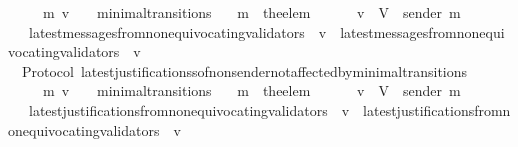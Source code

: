 \begin{isabellebody}
\ \ {\isachardoublequoteopen}{\isasymforall}\ {\isasymsigma}\ {\isasymsigma}{\isacharprime}\ m{\isacharprime}\ v{\isachardot}\ {\isacharparenleft}{\isasymsigma}{\isacharcomma}\ {\isasymsigma}{\isacharprime}{\isacharparenright}\ {\isasymin}\ minimal{\isacharunderscore}transitions\isanewline
\ \ {\isasymlongrightarrow}\ m{\isacharprime}\ {\isacharequal}\ the{\isacharunderscore}elem\ {\isacharparenleft}{\isasymsigma}{\isacharprime}\ {\isacharminus}\ {\isasymsigma}{\isacharparenright}\isanewline
\ \ {\isasymlongrightarrow}\ v\ {\isasymin}\ V\ {\isacharminus}\ {\isacharbraceleft}sender\ m{\isacharprime}{\isacharbraceright}\isanewline
\ \ {\isasymlongrightarrow}\ latest{\isacharunderscore}messages{\isacharunderscore}from{\isacharunderscore}non{\isacharunderscore}equivocating{\isacharunderscore}validators\ {\isasymsigma}\ v\ {\isacharequal}\ latest{\isacharunderscore}messages{\isacharunderscore}from{\isacharunderscore}non{\isacharunderscore}equivocating{\isacharunderscore}validators\ {\isasymsigma}{\isacharprime}\ v{\isachardoublequoteclose}\isanewline
%
\isadelimproof
\ \ %
\endisadelimproof
%
\isatagproof
{}\isamarkupfalse%
%
\endisatagproof
{\isafoldproof}%
%
\isadelimproof
\isanewline
%
\endisadelimproof
\isanewline
\isanewline
{}\isamarkupfalse%
\ {\isacharparenleft}\ Protocol{\isacharparenright}\ latest{\isacharunderscore}justificationss{\isacharunderscore}of{\isacharunderscore}non{\isacharunderscore}sender{\isacharunderscore}not{\isacharunderscore}affected{\isacharunderscore}by{\isacharunderscore}minimal{\isacharunderscore}transitions\ {\isacharcolon}\isanewline
\ \ {\isachardoublequoteopen}{\isasymforall}\ {\isasymsigma}\ {\isasymsigma}{\isacharprime}\ m{\isacharprime}\ v{\isachardot}\ {\isacharparenleft}{\isasymsigma}{\isacharcomma}\ {\isasymsigma}{\isacharprime}{\isacharparenright}\ {\isasymin}\ minimal{\isacharunderscore}transitions\isanewline
\ \ {\isasymlongrightarrow}\ m{\isacharprime}\ {\isacharequal}\ the{\isacharunderscore}elem\ {\isacharparenleft}{\isasymsigma}{\isacharprime}\ {\isacharminus}\ {\isasymsigma}{\isacharparenright}\isanewline
\ \ {\isasymlongrightarrow}\ v\ {\isasymin}\ V\ {\isacharminus}\ {\isacharbraceleft}sender\ m{\isacharprime}{\isacharbraceright}\isanewline
\ \ {\isasymlongrightarrow}\ latest{\isacharunderscore}justifications{\isacharunderscore}from{\isacharunderscore}non{\isacharunderscore}equivocating{\isacharunderscore}validators\ {\isasymsigma}\ v\ {\isacharequal}\ latest{\isacharunderscore}justifications{\isacharunderscore}from{\isacharunderscore}non{\isacharunderscore}equivocating{\isacharunderscore}validators\ {\isasymsigma}{\isacharprime}\ v{\isachardoublequoteclose}\isanewline

\end{isabellebody}
